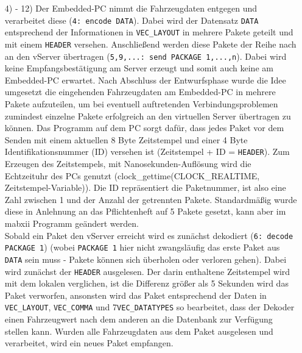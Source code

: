 \documentclass[fontsize = 12pt, paper = a4]{scrreprt}
\begin{document}
\begin{itemize}
\item[4) - 12)]
Der Embedded-PC nimmt die Fahrzeugdaten entgegen und verarbeitet diese (\texttt{4: encode DATA}). Dabei wird der Datensatz \texttt{DATA} entsprechend der Informationen in \texttt{VEC\_LAYOUT} in mehrere Pakete geteilt und mit einem \texttt{HEADER} versehen. Anschließend werden diese Pakete der Reihe nach an den vServer übertragen (\texttt{5,9,...: send PACKAGE 1,...,n}). Dabei wird keine Empfangsbestätigung am Server erzeugt und somit auch keine am Embedded-PC erwartet. 
Nach Abschluss der Entwurfsphase wurde die Idee umgesetzt die eingehenden Fahrzeugdaten am Embedded-PC in mehrere Pakete aufzuteilen, um bei eventuell auftretenden Verbindungsproblemen zumindest einzelne Pakete erfolgreich an den virtuellen Server übertragen zu können. Das Programm auf dem PC sorgt dafür, dass jedes Paket vor dem Senden mit einem aktuellen 8 Byte Zeitstempel und einer 4 Byte Identifikationsnummer (ID) versehen ist (Zeitstempel + ID = \texttt{HEADER}). Zum Erzeugen des Zeitstempels, mit Nanosekunden-Auflösung wird die Echtzeituhr des PCs genutzt (clock\_gettime(CLOCK\_REALTIME, Zeitstempel-Variable)). Die ID repräsentiert die Paketnummer, ist also eine Zahl zwischen 1 und der Anzahl der getrennten Pakete. Standardmäßig wurde diese in Anlehnung an das Pflichtenheft auf 5 Pakete gesetzt, kann aber im mabxii Programm geändert werden. \\
Sobald ein Paket den vServer erreicht wird es zunächst dekodiert (\texttt{6: decode PACKAGE 1}) (wobei \texttt{PACKAGE 1} hier nicht zwangsläufig das erste Paket aus \texttt{DATA} sein muss - Pakete können sich überholen oder verloren gehen). Dabei wird zunächst der \texttt{HEADER} ausgelesen. Der darin enthaltene Zeitstempel wird mit dem lokalen verglichen, ist die Differenz größer als 5 Sekunden wird das Paket verworfen, ansonsten wird das Paket entsprechend der Daten in \texttt{VEC\_LAYOUT}, \texttt{VEC\_COMMA} und 7\texttt{VEC\_DATATYPES} so bearbeitet, dass der Dekoder einen Fahrzeugwert nach dem anderen an die Datenbank zur Verfügung stellen kann. Wurden alle Fahrzeugdaten aus dem Paket ausgelesen und verarbeitet, wird ein neues Paket empfangen. 

\end{itemize}
\end{document}
